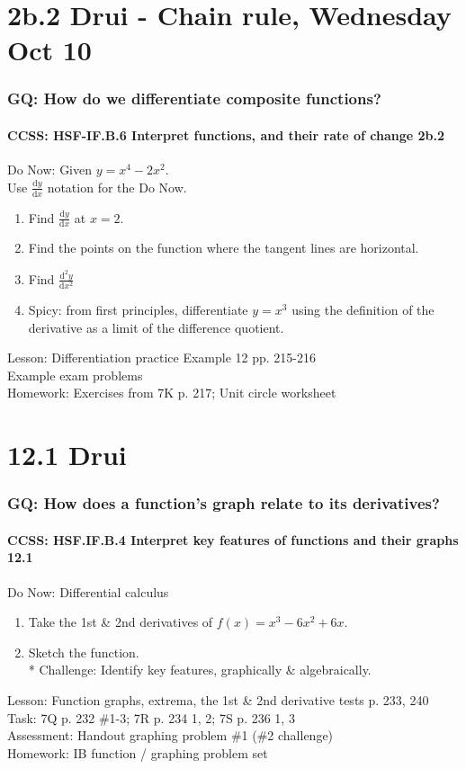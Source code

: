 \documentclass{beamer}
\begin{document}
\section{2b.2 Drui - Chain rule, Wednesday Oct 10}
  \frame
  {
    \frametitle{GQ: How do we differentiate composite functions?}
    \framesubtitle{CCSS: HSF-IF.B.6 Interpret functions, and their rate of change  \alert{2b.2}}

    \begin{block}{Do Now: Given $y= x^4-2x^2$. \\Use $\frac{\mathrm{d}y}{\mathrm{d}x}$ notation for the Do Now.}
      \begin{enumerate}
      \item Find $\frac{\mathrm{d}y}{\mathrm{d}x}$ at $x=2$.
      \item Find the points on the function where the tangent lines are horizontal.
      \item Find $\frac{\mathrm{d}^2y}{\mathrm{d}x^2}$
      \item Spicy: from first principles, differentiate $y=x^3$ using the definition of the derivative as a limit of the difference quotient.
      \end{enumerate}
   \end{block}
    Lesson: Differentiation practice Example 12 pp. 215-216\\
    Example exam problems\\ \bigskip
    Homework: Exercises from 7K p. 217; Unit circle worksheet
  }



\section{12.1 Drui}
  \frame
  {
    \frametitle{GQ: How does a function's graph relate to its derivatives?}
    \framesubtitle{CCSS: HSF.IF.B.4 Interpret key features of functions and their graphs \qquad \alert{12.1}}

    \begin{block}{Do Now: Differential calculus}
    \begin{enumerate}
        \item Take the 1st \& 2nd derivatives of $f(x)=x^3-6x^2+6x$.
        \item Sketch the function.\\*
        Challenge: Identify key features, graphically \& algebraically.
    \end{enumerate}
    \end{block}
    Lesson: Function graphs, extrema, the 1st \& 2nd derivative tests p. 233, 240\\%
    Task: 7Q p. 232 \#1-3; 7R p. 234 1, 2; 7S p. 236 1, 3 \\%
    Assessment: Handout graphing problem \#1 (\#2 challenge)
    \\%
    Homework: IB function / graphing problem set
  }
\end{document}

